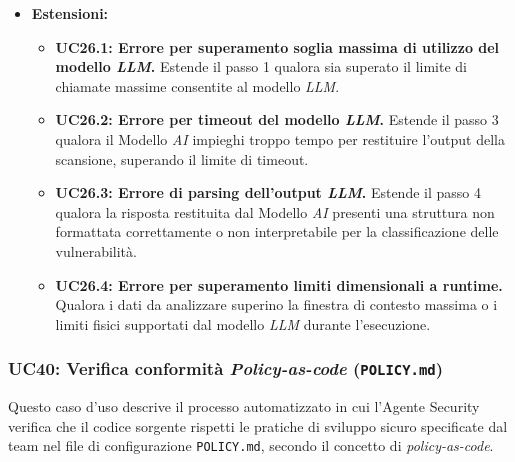 \documentclass[12pt, a4paper]{article}
\begin{document}
\begin{itemize}
\begin{enumerate}
        \item Il sistema formatta le criticità ottenute per la visualizzazione strutturata, associando a ciascuna la categoria \textit{OWASP} (UC25.2.2.1.1), il livello di gravità (UC25.2.2.1.2), la porzione di codice interessata (UC25.2.2.1.3) e integrando le soluzioni proposte nei moduli per gli \textit{snippet} di codice (UC25.2.3) o di testo formattato (UC25.2.1).
        \item Il sistema registra il successo dell'attività, ne aggiorna lo stato a "Completato" nella dashboard di monitoraggio (UC22.1.2) e rende disponibile all'utente il report dell'operazione (UC25).
    \end{enumerate}
    \item \textbf{Estensioni:}
    \begin{itemize}
        \item \textbf{UC26.1: Errore per superamento soglia massima di utilizzo del modello \textit{LLM}.} Estende il passo 1 qualora sia superato il limite di chiamate massime consentite al modello \textit{LLM}.
        \item \textbf{UC26.2: Errore per timeout del modello \textit{LLM}.} Estende il passo 3 qualora il Modello \textit{AI} impieghi troppo tempo per restituire l'output della scansione, superando il limite di timeout.
        \item \textbf{UC26.3: Errore di parsing dell'output \textit{LLM}.} Estende il passo 4 qualora la risposta restituita dal Modello \textit{AI} presenti una struttura non formattata correttamente o non interpretabile per la classificazione delle vulnerabilità.
        \item \textbf{UC26.4: Errore per superamento limiti dimensionali a runtime.} Qualora i dati da analizzare superino la finestra di contesto massima o i limiti fisici supportati dal modello \textit{LLM} durante l'esecuzione.
    \end{itemize}
\end{itemize}

\subsubsection{UC40: Verifica conformità \textit{Policy-as-code} (\texttt{POLICY.md})}\label{uc:40}
Questo caso d'uso descrive il processo automatizzato in cui l'Agente Security verifica che il codice sorgente rispetti le pratiche di sviluppo sicuro specificate dal team nel file di configurazione \texttt{POLICY.md}, secondo il concetto di \textit{policy-as-code}.
\end{document}
